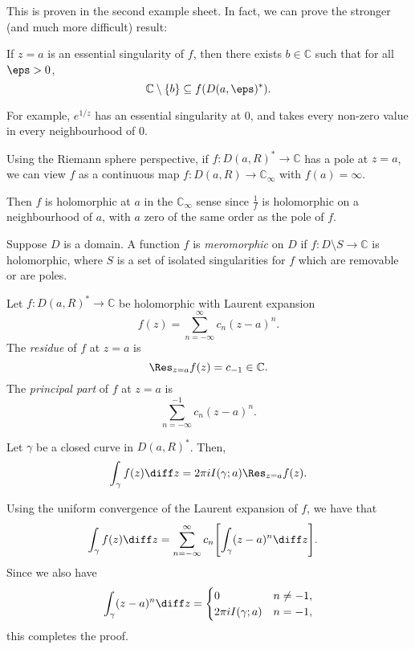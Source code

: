 \documentclass[12pt]{article}
\begin{document}
This is proven in the second example sheet. In fact, we can prove the stronger (and much more difficult) result:

\begin{theorem}
	If $z = a$ is an essential singularity of $f$, then there exists $b \in \mathbb{C}$ such that for all $\eps > 0$,
	\[
		\mathbb{C} \setminus \{b\} \subseteq f(D(a, \eps)^{*}).
	\]
\end{theorem}

For example, $e^{1/z}$ has an essential singularity at $0$, and takes every non-zero value in every neighbourhood of $0$.

\begin{remark}
	Using the Riemann sphere perspective, if $f : D(a, R)^{*} \to \mathbb{C}$ has a pole at $z = a$, we can view $f$ as a continuous map $f : D(a, R) \to \mathbb{C}_\infty$ with $f(a) = \infty$.

	Then $f$ is holomorphic at $a$ in the $\mathbb{C}_\infty$ sense since $\frac{1}{f}$ is holomorphic on a neighbourhood of $a$, with $a$ zero of the same order as the pole of $f$.
\end{remark}

\begin{definition}
	Suppose $D$ is a domain. A function $f$ is \emph{meromorphic} on $D$ if $f : D \setminus S \to \mathbb{C}$ is holomorphic, where $S$ is a set of isolated singularities for $f$ which are removable or are poles.
\end{definition}

\begin{definition}
	Let $f : D(a, R)^* \to \mathbb{C}$ be holomorphic with Laurent expansion
	\[
		f(z) = \sum_{n=-\infty}^\infty c_n(z-a)^n.
	\]
	The \emph{residue} of $f$ at $z = a$ is
	\[
		\Res_{z=a} f(z) = c_{-1} \in \mathbb{C}.
	\]
	The \emph{principal part} of $f$ at $z = a$ is
	\[
		\sum_{n=-\infty}^{-1} c_n(z-a)^n.
	\]
\end{definition}

\begin{proposition}
	Let $\gamma$ be a closed curve in $D(a, R)^*$. Then,
	\[
		\int_\gamma f(z) \diff z = 2 \pi i I(\gamma; a) \Res_{z=a} f(z).
	\]
\end{proposition}

\begin{proofbox}
	Using the uniform convergence of the Laurent expansion of $f$, we have that
	\begin{align*}
		\int_\gamma f(z) \diff z &= \sum_{n=-\infty}^\infty c_n \Biggl[ \int_\gamma (z-a)^n \diff z \Biggr].
	\end{align*}
	Since we also have
	\[
	\int_\gamma (z-a)^n \diff z =
	\begin{cases}
		0 & n \neq -1,\\
		2\pi i I(\gamma; a) & n = -1,
	\end{cases}
	\]
	this completes the proof.
\end{proofbox}
\end{document}
